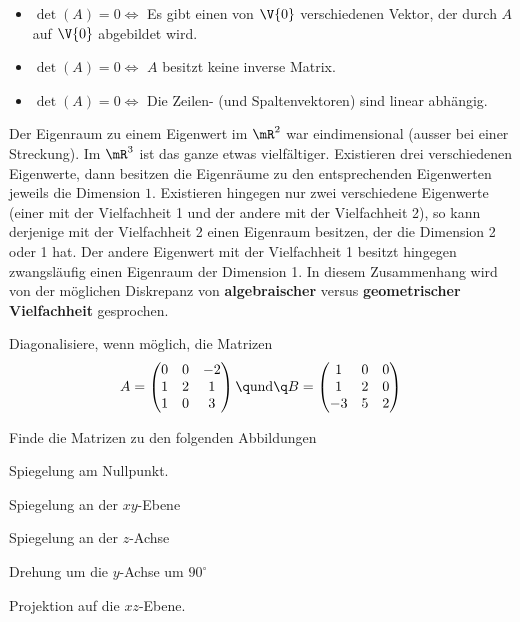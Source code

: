 \documentclass[%
11pt,%
twoside,%
titlepage,%
german,%
headsepline%
]{scrartcl}
\begin{document}
\begin{itemize}
\item $\det(A)=0\Leftrightarrow$ Es gibt einen von $\V{0}$ verschiedenen Vektor, der durch $A$ auf $\V{0}$ abgebildet wird.
\item $\det(A)=0\Leftrightarrow$ $A$ besitzt keine inverse Matrix.
\item $\det(A)=0\Leftrightarrow$ Die Zeilen- (und Spaltenvektoren) sind linear abhängig.
\end{itemize}

\begin{bem}
Der Eigenraum zu einem Eigenwert im $\mR^2$ war eindimensional (ausser bei einer Streckung). Im $\mR^3$ ist das ganze etwas vielfältiger. Existieren drei verschiedenen Eigenwerte, dann besitzen die Eigenräume zu den entsprechenden Eigenwerten jeweils die Dimension $1$. Existieren hingegen nur zwei verschiedene Eigenwerte (einer mit der Vielfachheit 1 und der andere mit der Vielfachheit 2), so kann derjenige mit der Vielfachheit 2 einen Eigenraum besitzen, der die Dimension 2 oder 1 hat. Der andere Eigenwert mit der Vielfachheit 1 besitzt hingegen zwangsläufig einen Eigenraum der Dimension 1. In diesem Zusammenhang wird von der möglichen Diskrepanz von \textbf{algebraischer} versus \textbf{geometrischer Vielfachheit} gesprochen.
\end{bem}

\begin{ueb}
Diagonalisiere, wenn möglich, die Matrizen
$$A=
\begin{pmatrix}
0&0&-2\\
1&2&1\\
1&0&3\\
\end{pmatrix}
\q\text{und}\q
B=
\begin{pmatrix}
1&0&0\\
1&2&0\\
-3&5&2\\
\end{pmatrix}$$
\end{ueb}

\begin{ueb}\label{ueb:mats}
Finde die Matrizen zu den folgenden Abbildungen
\begin{enumeratea}
\item Spiegelung am Nullpunkt.
\item Spiegelung an der $xy$-Ebene
\item Spiegelung an der $z$-Achse
\item Drehung um die $y$-Achse um $90^\circ$
\item Projektion auf die $xz$-Ebene.
\end{enumeratea}
\end{ueb}
\end{document}
